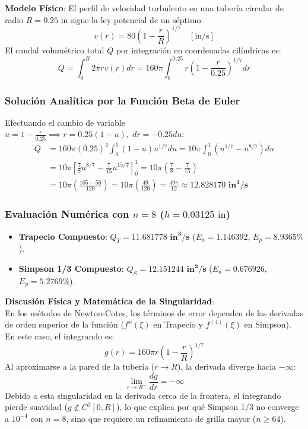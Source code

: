 \documentclass[11pt,a4paper]{article}
\begin{document}
\textbf{Modelo Físico}: El perfil de velocidad turbulento en una tubería circular de radio $R = 0.25\text{ in}$ sigue la ley potencial de un séptimo:
\begin{equation}
v(r) = 80 \left(1 - \frac{r}{R}\right)^{1/7} \quad [\text{in/s}]
\end{equation}
El caudal volumétrico total $Q$ por integración en coordenadas cilíndricas es:
\begin{equation}
Q = \int_0^R 2\pi r v(r) dr = 160\pi \int_0^{0.25} r \left(1 - \frac{r}{0.25}\right)^{1/7} dr
\end{equation}

\subsubsection{Solución Analítica por la Función Beta de Euler}
Efectuando el cambio de variable $u = 1 - \frac{r}{0.25} \implies r = 0.25(1 - u), \; dr = -0.25 du$:
\begin{align*}
Q &= 160\pi (0.25)^2 \int_0^1 (1 - u) u^{1/7} du = 10\pi \int_0^1 (u^{1/7} - u^{8/7}) du \\
  &= 10\pi \left[ \frac{7}{8} u^{8/7} - \frac{7}{15} u^{15/7} \right]_0^1 = 10\pi \left( \frac{7}{8} - \frac{7}{15} \right) \\
  &= 10\pi \left( \frac{105 - 56}{120} \right) = 10\pi \left( \frac{49}{120} \right) = \frac{49\pi}{12} \approx \mathbf{12.828170 \text{ in}^3/\text{s}}
\end{align*}

\subsubsection{Evaluación Numérica con $n=8$ ($h = 0.03125\text{ in}$)}
\begin{itemize}
    \item \textbf{Trapecio Compuesto}: $Q_T = \mathbf{11.681778 \text{ in}^3/\text{s}}$ ($E_a = 1.146392$, $E_p = 8.9365\%$).
    \item \textbf{Simpson 1/3 Compuesto}: $Q_S = \mathbf{12.151244 \text{ in}^3/\text{s}}$ ($E_a = 0.676926$, $E_p = 5.2769\%$).
\end{itemize}

\begin{notabox}
\textbf{Discusión Física y Matemática de la Singularidad}:\\
En los métodos de Newton-Cotes, los términos de error dependen de las derivadas de orden superior de la función ($f''(\xi)$ en Trapecio y $f^{(4)}(\xi)$ en Simpson). En este caso, el integrando es:
$$g(r) = 160\pi r \left(1 - \frac{r}{R}\right)^{1/7}$$
Al aproximarse a la pared de la tubería ($r \to R$), la derivada diverge hacia $-\infty$:
$$\lim_{r \to R^-} \frac{dg}{dr} = -\infty$$
Debido a esta singularidad en la derivada cerca de la frontera, el integrando pierde suavidad ($g \notin C^2[0, R]$), lo que explica por qué Simpson 1/3 no converge a $10^{-4}$ con $n=8$, sino que requiere un refinamiento de grilla mayor ($n \ge 64$).
\end{notabox}
\end{document}
